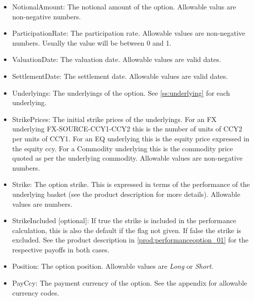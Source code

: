 \begin{itemize}
\item NotionalAmount: The notional amount of the option. Allowable valus are non-negative numbers.
\item ParticipationRate: The participation rate. Allowable values are non-negative numbers. Usually the value will be
  between 0 and 1.
\item ValuationDate: The valuation date.  Allowable values are valid dates.
\item SettlementDate: The settlement date. Allowable values are valid dates.
\item Underlyings: The underlyings of the option. See \ref{ss:underlying} for each underlying.
\item StrikePrices: The initial strike prices of the underlyings. For an FX underlying FX-SOURCE-CCY1-CCY2 this is the
  number of units of CCY2 per units of CCY1. For an EQ underlying this is the equity price expressed in the equity ccy. For a Commodity underlying this is the commodity price quoted as per the underlying commodity.
  Allowable values are non-negative numbers.
\item Strike: The option strike. This is expressed in terms of the performance of the underlying basket (see the product
  description for more details). Allowable values are numbers.
\item StrikeIncluded [optional]: If true the strike is included in the performance calculation, this is also the default
  if the flag not given. If false the strike is excluded. See the product description in \ref{prod:performanceoption_01}
  for the respective payoffs in both cases.
\item Position: The option position. Allowable values are {\em Long} or {\em Short}.
\item PayCcy: The payment currency of the option. See the appendix for allowable currency codes.
\end{itemize}
